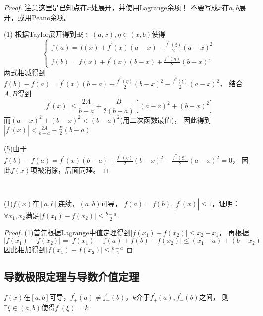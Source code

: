 \begin{proof}
  注意这里是已知点在$x$处展开，并使用Lagrange余项！
  不要写成$x$在$a,b$展开，或用Peano余项。
  
  (1)
  根据Taylor展开得到$\exists \xi \in (a,x), \eta \in (x,b)$使得
  \begin{equation*}
    \begin{cases}
      f(a) = f(x) + f^{\prime}(x) (a - x) + \frac{f^{\prime\prime}(\xi)}{2}(a - x)^2\\
      f(b) = f(x) + f^{\prime}(x)(b - x) + \frac{f^{\prime\prime}(\eta)}{2}(b - x)^2
    \end{cases}
  \end{equation*}
  两式相减得到$f(b) - f(a) = f^{\prime}(x)(b - a) + \frac{f^{\prime\prime}(\eta)}{2}(b - x)^2 - \frac{f^{\prime\prime}(\xi)}{2}(a - x)^2$，
  结合$A,B$得到
  \begin{equation*}
    |f^{\prime}(x)| \leq \frac{2A}{b - a} + \frac{B}{2(b - a)}[(a - x)^2 + (b - x)^2]
  \end{equation*}
  而$(a - x)^2 + (b - x)^2 < (b - a)^2$(用二次函数最值)，
  因此得到$|f^{\prime}(x)| < \frac{2A}{b - a} + \frac{B}{2}(b - a)$

  (5)由于$f(b) - f(a) = f^{\prime}(x)(b - a) + \frac{f^{\prime\prime}(\eta)}{2}(b - x)^2 - \frac{f^{\prime\prime}(\xi)}{2}(a - x)^2 = 0$，
  因此$f(x)$项被消除，后面同理。
\end{proof}

~

\begin{exercise}[几道经典配凑放缩]
  (1)$f(x)$在$[a,b]$连续，$(a,b)$可导，
  $f(a) = f(b), |f^{\prime}(x)| \leq 1$，证明：$\forall x_1,x_2$满足$|f(x_1) - f(x_2)| \leq \frac{b-a}{2}$
\end{exercise}

\begin{proof}
  (1)首先根据Lagrange中值定理得到$|f(x_1) - f(x_2)| \leq x_2 - x_1$，
  再根据
  \begin{equation*}
    |f(x_1) - f(x_2)| = |f(x_1) - f(a) + f(b) - f(x_2)| \leq (x_1 - a) + (b - x_2)
  \end{equation*}
  因此相加得到$|f(x_1) - f(x_2)| \leq \frac{b - a}{2}$
\end{proof}

\subsection{导数极限定理与导数介值定理}

\begin{theorem}
  $f(x)$在$[a,b]$可导，$f_+^{\prime}(a) \neq f_-^{\prime}(b)$，$k$介于$f_+^{\prime}(a), f_-^{\prime}(b)$之间，
  则$\exists \xi \in (a,b)$使得$f^{\prime}(\xi) = k$
\end{theorem}

